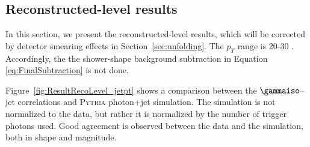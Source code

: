 \FloatBarrier
\subsection{Reconstructed-level results}
In this section, we present the reconstructed-level results, which will be corrected by detector smearing effects in Section~\ref{sec:unfolding}. The $p_T$ range is 20-30 \GeVc. Accordingly, the the shower-shape background subtraction in Equation \ref{eq:FinalSubtraction} is not done.

Figure~\ref{fig:ResultRecoLevel_jetpt} shows a comparison between the $\gammaiso$--jet correlations and \textsc{Pythia} photon+jet simulation. The simulation is not normalized to the data, but rather it is normalized by the number of trigger photons used. Good agreement is observed between the data and the simulation, both in shape and magnitude. 

